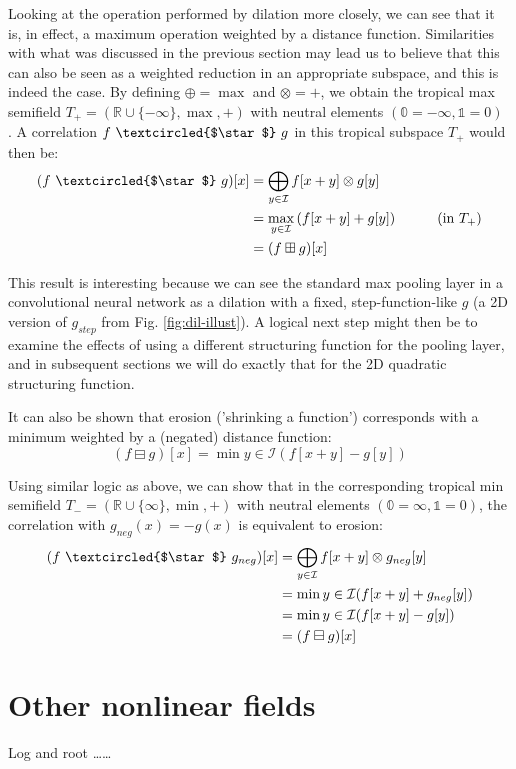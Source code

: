 \documentclass[a4paper, 12pt]{report}
\def\comment#1{\color{red}#1\color{black}}
\begin{document}
Looking at the operation performed by dilation more closely, we can see that it is, in effect, a maximum operation weighted by a distance function. Similarities with what was discussed in the previous section may lead us to believe that this can also be seen as a weighted reduction in an appropriate subspace, and this is indeed the case. By defining $\oplus=\max$ and $\otimes=+$, we obtain the tropical max semifield $T_+=(\mathbb{R}\cup\{-\infty\},\max,+)$ with neutral elements $(\mathbb{0}=-\infty, \mathbb{1}=0)$ \cite{bellaardaxiomatic}. A correlation $f ~\textcircled{$\star$}~ g$ in this tropical subspace $T_+$ would then be:
\begin{align*}
	(f ~\textcircled{$\star$}~ g)[x]
	&= \bigoplus_{y\in \mathcal{I}}f[x+y] \otimes g[y] \\
	&= \max_{y\in \mathcal{I}}\left(f[x+y] + g[y]\right) \hspace{1cm}\textrm{(in $T_+$)} \\
	&= (f \boxplus g)[x]
\end{align*}

This result is interesting because we can see the standard max pooling layer in a convolutional neural network as a dilation with a fixed, step-function-like $g$ (a 2D version of $g_{step}$ from Fig. \ref{fig:dil-illust}). A logical next step might then be to examine the effects of using a different structuring function for the pooling layer, and in subsequent sections we will do exactly that for the 2D quadratic structuring function.

It can also be shown that erosion ('shrinking a function') corresponds with a minimum weighted by a (negated) distance function: $$(f \boxminus g)[x]=\min{y\in \mathcal{I}}(f[x+y] - g[y])$$ 

Using similar logic as above, we can show that in the corresponding tropical min semifield $T_-=(\mathbb{R}\cup\{\infty\},\min,+)$ with neutral elements $(\mathbb{0}=\infty, \mathbb{1}=0)$, the correlation with $g_{neg}(x)=-g(x)$ is equivalent to erosion:
\begin{align*}
	(f ~\textcircled{$\star$}~ g_{neg})[x]
	&= \bigoplus_{y\in \mathcal{I}}f[x+y] \otimes g_{neg}[y] \\
	&= \min{y\in \mathcal{I}}(f[x+y] + g_{neg}[y]) \\
	&= \min{y\in \mathcal{I}}(f[x+y] - g[y]) \\
	&= (f \boxminus g)[x]
\end{align*}

\section{Other nonlinear fields}
Log and root \cite{bellaardaxiomatic} \comment{\ldots\ldots}
\end{document}
